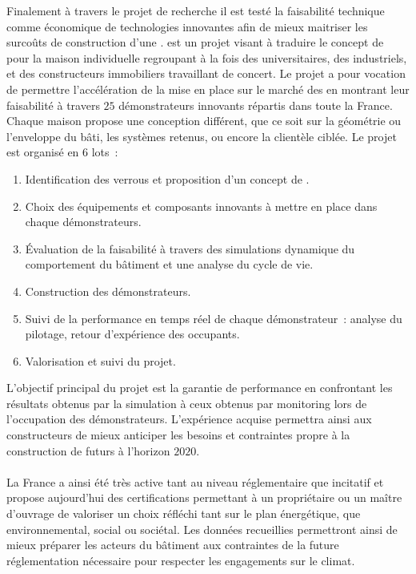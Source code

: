 Finalement à travers le projet de recherche  il est testé la faisabilité
technique comme économique de technologies innovantes afin de mieux maitriser les surcoûts
de construction d’une .  est un projet visant à traduire
le concept de  pour la maison individuelle regroupant à la fois des
universitaires, des industriels, et des constructeurs immobiliers travaillant de
concert. Le projet a pour vocation de permettre l’accélération de la mise en place sur le
marché des  en montrant leur faisabilité à travers $25$ démonstrateurs
innovants répartis dans toute la France. Chaque maison propose une conception différent,
que ce soit sur la géométrie ou l’enveloppe du bâti, les systèmes retenus, ou encore la
clientèle ciblée. Le projet est organisé en $6$ lots~:
\begin{enumerate}
  \item Identification des verrous et proposition d’un concept de .
  \item Choix des équipements et composants innovants à mettre en place dans chaque
        démonstrateurs.
  \item Évaluation de la faisabilité à travers des simulations dynamique du comportement
        du bâtiment et une analyse du cycle de vie.
  \item Construction des démonstrateurs.
  \item Suivi de la performance en temps réel de chaque démonstrateur~: analyse du pilotage,
        retour d’expérience des occupants.
  \item Valorisation et suivi du projet.
\end{enumerate}
L’objectif principal du projet est la garantie de performance en confrontant les résultats
obtenus par la simulation à ceux obtenus par monitoring lors de l’occupation des
démonstrateurs. L’expérience acquise permettra ainsi aux constructeurs de mieux anticiper
les besoins et contraintes propre à la construction de futurs  à l’horizon
$2020$.

\paragraph{} %
La France a ainsi été très active tant au niveau réglementaire que incitatif et propose
aujourd’hui des certifications permettant à un propriétaire ou un maître d’ouvrage de
valoriser un choix réfléchi tant sur le plan énergétique, que environnemental, social ou
sociétal. Les données recueillies permettront ainsi de mieux préparer les acteurs
du bâtiment aux contraintes de la future réglementation nécessaire pour respecter les engagements sur le climat.


